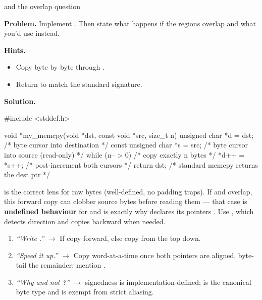 \begin{gymproblem}{ and the overlap question}

\textbf{Problem.} Implement
. Then state
what happens if the regions overlap and what you'd use instead.

\textbf{Hints.}
\begin{itemize}
\item Copy byte by byte through .
\item Return  to match the standard signature.
\end{itemize}

\attempt

\textbf{Solution.}
\begin{cgym}
#include <stddef.h>

void *my_memcpy(void *dst, const void *src, size_t n) {
    unsigned char *d = dst;          /* byte cursor into destination          */
    const unsigned char *s = src;    /* byte cursor into source (read-only)   */
    while (n-- > 0) {                /* copy exactly n bytes                  */
        *d++ = *s++;                 /* post-increment both cursors           */
    }
    return dst;                      /* standard memcpy returns the dest ptr  */
}
\end{cgym}

 is the correct lens for raw bytes (well-defined, no
padding traps). If  and  overlap, this forward copy can
clobber source bytes before reading them --- that case is \textbf{undefined
behaviour} for  and is exactly why  declares its
pointers . Use , which detects direction and
copies backward when needed.

\followups
\begin{enumerate}
\item \emph{``Write .''} $\rightarrow$ If  copy
  forward, else copy from the top down.
\item \emph{``Speed it up.''} $\rightarrow$ Copy word-at-a-time once both
  pointers are aligned, byte-tail the remainder; mention .
\item \emph{``Why  and not ?''} $\rightarrow$
   signedness is implementation-defined;  is
  the canonical byte type and is exempt from strict aliasing.
\end{enumerate}
\end{gymproblem}


